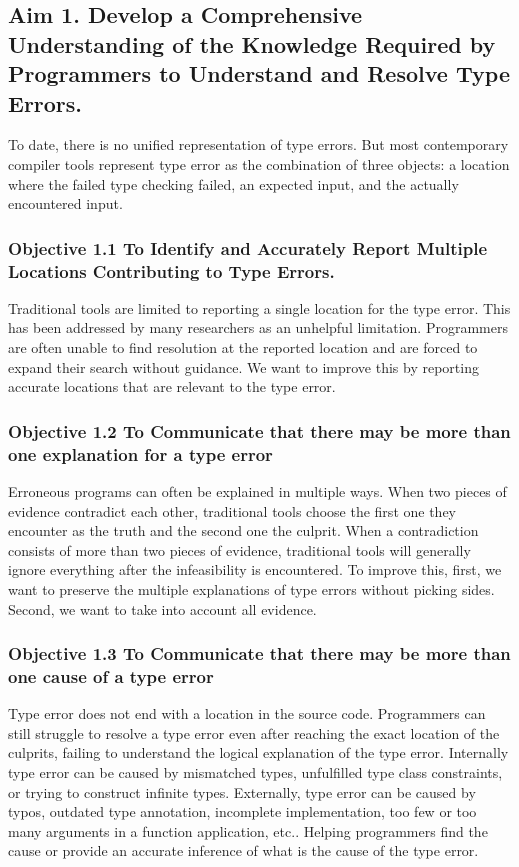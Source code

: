 \subsection{Aim 1. Develop a Comprehensive Understanding of the Knowledge Required by Programmers to Understand and Resolve Type Errors.}

To date, there is no unified representation of type errors. But most contemporary compiler tools represent type error as the combination of three objects: a location where the failed type checking failed, an expected input, and the actually encountered input.

\subsubsection{Objective 1.1 To Identify and Accurately Report Multiple Locations Contributing to Type Errors.}

Traditional tools are limited to reporting a single location for the type error. This has been addressed by many researchers as an unhelpful limitation. Programmers are often unable to find resolution at the reported location and are forced to expand their search without guidance. We want to improve this by reporting accurate locations that are relevant to the type error.

\subsubsection{Objective 1.2 To Communicate that there may be more than one explanation for a type error}

Erroneous programs can often be explained in multiple ways. When two pieces of evidence contradict each other, traditional tools choose the first one they encounter as the truth and the second one the culprit. When a contradiction consists of more than two pieces of evidence, traditional tools will generally ignore everything after the infeasibility is encountered. To improve this, first, we want to preserve the multiple explanations of type errors without picking sides. Second, we want to take into account all evidence.

\subsubsection{Objective 1.3 To Communicate that there may be more than one cause of a type error}

Type error does not end with a location in the source code. Programmers can still struggle to resolve a type error even after reaching the exact location of the culprits, failing to understand the logical explanation of the type error. Internally type error can be caused by mismatched types, unfulfilled type class constraints, or trying to construct infinite types. Externally, type error can be caused by typos, outdated type annotation, incomplete implementation, too few or too many arguments in a function application, etc.. Helping programmers find the cause or provide an accurate inference of what is the cause of the type error.

